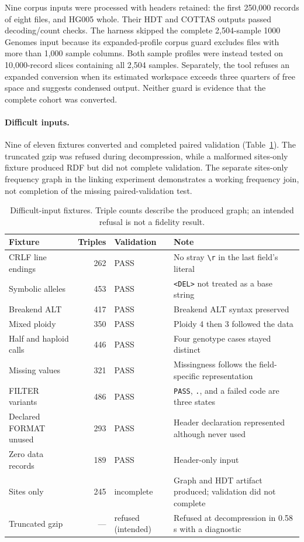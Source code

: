 \documentclass[11pt]{article}
\begin{document}
Nine corpus inputs were processed with headers retained: the first 250,000 records of eight files, and HG005 whole.
Their HDT and COTTAS outputs passed decoding/count checks.
The harness skipped the complete 2,504-sample 1000 Genomes input because its expanded-profile corpus guard excludes files with more than 1,000 sample columns.
Both sample profiles were instead tested on 10,000-record slices containing all 2,504 samples.
Separately, the tool refuses an expanded conversion when its estimated workspace exceeds three quarters of free space and suggests condensed output.
Neither guard is evidence that the complete cohort was converted.

\paragraph{Difficult inputs.}
Nine of eleven fixtures converted and completed paired validation (Table~\ref{tab:difficult-inputs}).
The truncated gzip was refused during decompression, while a malformed sites-only fixture produced RDF but did not complete validation.
The separate sites-only frequency graph in the linking experiment demonstrates a working frequency join, not completion of the missing paired-validation test.

\begin{table}[!htbp]
\caption{Difficult-input fixtures. Triple counts describe the produced graph; an intended refusal is not a fidelity result.}\label{tab:difficult-inputs}%
\centering\footnotesize\setlength{\tabcolsep}{4pt}\renewcommand{\arraystretch}{1.1}%
\begin{tabularx}{\textwidth}{@{}l r l >{\raggedright\arraybackslash}X@{}}
\toprule
\textbf{Fixture} & \textbf{Triples} & \textbf{Validation} & \textbf{Note}\\
\midrule
CRLF line endings & 262 & PASS & No stray \texttt{\textbackslash r} in the last field's literal\\
Symbolic alleles & 453 & PASS & \texttt{<DEL>} not treated as a base string\\
Breakend ALT & 417 & PASS & Breakend ALT syntax preserved\\
Mixed ploidy & 350 & PASS & Ploidy 4 then 3 followed the data\\
Half and haploid calls & 446 & PASS & Four genotype cases stayed distinct\\
Missing values & 321 & PASS & Missingness follows the field-specific representation\\
FILTER variants & 486 & PASS & \texttt{PASS}, \texttt{.}, and a failed code are three states\\
Declared FORMAT unused & 293 & PASS & Header declaration represented although never used\\
Zero data records & 189 & PASS & Header-only input\\
\midrule
Sites only & 245 & incomplete & Graph and HDT artifact produced; validation did not complete\\
Truncated gzip & --- & refused (intended) & Refused at decompression in 0.58\,s with a diagnostic\\
\bottomrule
\end{tabularx}
\end{table}
\end{document}
